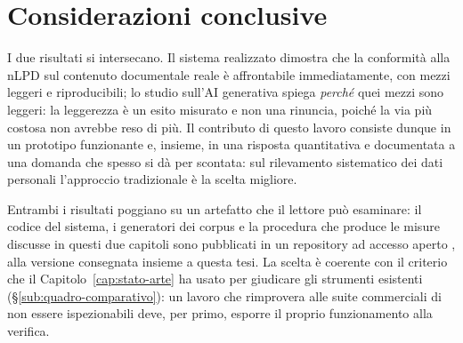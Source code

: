 \section{Considerazioni conclusive}
\label{sec:risultati-chiusura}

I due risultati si intersecano. Il sistema realizzato dimostra che la conformità alla nLPD sul contenuto documentale reale è affrontabile immediatamente, con mezzi leggeri e riproducibili; lo studio sull'AI generativa spiega \emph{perché} quei mezzi sono leggeri: la leggerezza è un esito misurato e non una rinuncia, poiché la via più costosa non avrebbe reso di più. Il contributo di questo lavoro consiste dunque in un prototipo funzionante e, insieme, in una risposta quantitativa e documentata a una domanda che spesso si dà per scontata: sul rilevamento sistematico dei dati personali l'approccio tradizionale è la scelta migliore.

Entrambi i risultati poggiano su un artefatto che il lettore può esaminare: il codice del sistema, i generatori dei corpus e la procedura che produce le misure discusse in questi due capitoli sono pubblicati in un repository ad accesso aperto \cite{algisi2026piidiscovery}, alla versione consegnata insieme a questa tesi. La scelta è coerente con il criterio che il Capitolo~\ref{cap:stato-arte} ha usato per giudicare gli strumenti esistenti (§\ref{sub:quadro-comparativo}): un lavoro che rimprovera alle suite commerciali di non essere ispezionabili deve, per primo, esporre il proprio funzionamento alla verifica.
